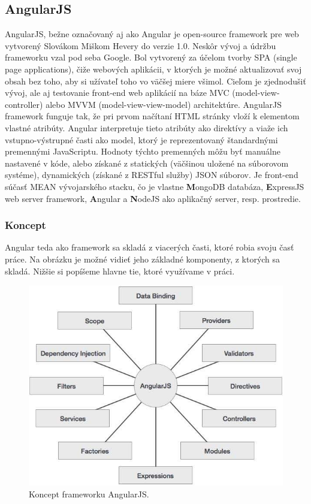 \subsection{AngularJS}
AngularJS, bežne označovaný aj ako Angular je open-source framework pre web vytvorený Slovákom Miškom Hevery do verzie 1.0. Neskôr vývoj a údržbu frameworku vzal pod seba Google. Bol vytvorený za účelom tvorby SPA (single page applications), čiže webových aplikácii, v ktorých je možné aktualizovať svoj obsah bez toho, aby si užívateľ toho vo väčšej miere všimol. Cieľom je zjednodušiť vývoj, ale aj testovanie front-end web aplikácií na báze MVC (model-view-controller) alebo MVVM (model-view-view-model) architektúre.
AngularJS framework funguje tak, že pri prvom načítaní HTML stránky vloží k elementom vlastné atribúty. Angular interpretuje tieto atribúty ako direktívy a viaže ich vstupno-výstrupné časti ako model, ktorý je reprezentovaný štandardnými premennými JavaScriptu. Hodnoty týchto premenných môžu byť manuálne nastavené v kóde, alebo získané z statických (väčšinou uložené na súborovom systéme), dynamických (získané z RESTful služby) JSON súborov.
Je front-end súčasť MEAN vývojarského stacku, čo je vlastne \textbf{M}ongoDB databáza, \textbf{E}xpressJS web server framework, \textbf{A}ngular  a \textbf{N}odeJS ako aplikačný server, resp. prostredie.

\subsubsection{Koncept}
Angular teda ako framework sa skladá z viacerých časti, ktoré robia svoju časť práce. Na obrázku je možné vidieť jeho základné komponenty, z ktorých sa skladá. Nižšie si popíšeme hlavne tie, ktoré využívame v práci.

\begin{figure}[H]
  \centering
  \includegraphics[scale=0.5]{img/angular/angularjs_concepts.jpg}
  \caption{Koncept frameworku AngularJS.}
  \label{img-real-vs-vl}
\end{figure}

